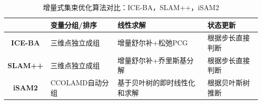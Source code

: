 \begin{table}[htb!]
    \centering
    \caption{增量式集束优化算法对比：ICE-BA，SLAM++，iSAM2}
    \vspace{6pt}
    \begin{tabularx}{\textwidth}{c|X|X|X}
        \toprule
                        & \textbf{变量分组/排序} & \textbf{线性求解}            & \textbf{状态更新} \\ \hline
        \textbf{ICE-BA} & 三维点独立成组         & 增量舒尔补+松弛PCG           & 根据步长直接判断  \\ \hline
        \textbf{SLAM++} & 三维点独立成组         & 增量舒尔补+乔里斯基分解      & 根据步长直接判断  \\ \hline
        \textbf{iSAM2}  & CCOLAMD自动分组        & 基于贝叶树的即时线性化和求解 & 根据贝叶斯树推断  \\ \bottomrule
    \end{tabularx}
    \label{tab:comp}
\end{table}
